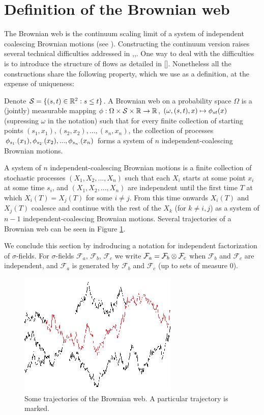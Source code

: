 {
\section{Definition of the Brownian web}
\label{sec:brownian-web-definition}

The Brownian web is the continuum scaling limit of a system of
independent coalescing Brownian motions (see
\cite{tsirelson-scaling-limit-noise-stability}).  Constructing the
continuum version raises several technical difficulties addressed in
\cite{toth-werner},\cite{fontes-et-al},\cite{norris-turner-convergence-to-bw}.
One way to deal with the difficulties is to introduce the
structure of flows as detailed in [].  Nonetheless all the
constructions share the following property, which we use as a
definition, at the expense of uniqueness:

  Denote $\mathcal{S}=\{(s, t) \in \mathbb{R}^2 : s \le t\}$.
  A Brownian web on a probability space $\Omega$ is a (jointly)
  measurable mapping $\phi : \Omega \times \mathcal{S} \times \mathbb{R}
  \to \mathbb{R}$, $(\omega, (s, t), x) \mapsto \phi_{{s}{t}}(x)$ (supressing
  $\omega$ in the notation) such that for every finite collection of
  starting points $(s_1, x_1),(s_2, x_2),...,(s_n, x_n)$, the
  collection of processes $\phi_{{s_1}{\cdot}}(x_1),
  \phi_{{s_2}{\cdot}}(x_2),...,\phi_{{s_n}{\cdot}}(x_n)$
  forms a system of $n$ independent-coalescing Brownian motions.

  A system of $n$ independent-coalescing Brownian motions is a finite
  collection of stochastic processes $(X_1, X_2,...,X_n)$ such that
  each $X_i$ starts at some point $x_i$ at some time $s_i$, and $(X_1,
  X_2,...,X_n)$ are independent until the first time $T$ at which
  $X_i(T)=X_j(T)$ for some $i\neq j$. From this time onwards $X_i(T)$
  and $X_j(T)$ coalesce and continue with the rest of the $X_k$ (for
  $k\neq i,j$) as a system of $n-1$ independent-coalescing Brownian motions.
  Several trajectories of a Brownian web can be seen in Figure
  \ref{fig:bw-trajectories}.

  \newcommand{\F}{\mathcal{F}}
We conclude this section by indroducing a notation for independent
factorization of $\sigma$-fields.
  For $\sigma$-fields $\F_a$, $\F_b$, $\F_c$ we write $\F_a = \F_b
  \tensor \F_c$ when $\F_b$ and $\F_c$ are independent, and $\F_a$
  is generated by $\F_b$ and $\F_c$ (up to sets of measure $0$).

\begin{figure}
   \centering
   \includegraphics[scale=2]{sometraj.eps}
   \caption{Some trajectories of the Brownian web. A particular trajectory is marked.}
  \label{fig:bw-trajectories}
\end{figure}
}
